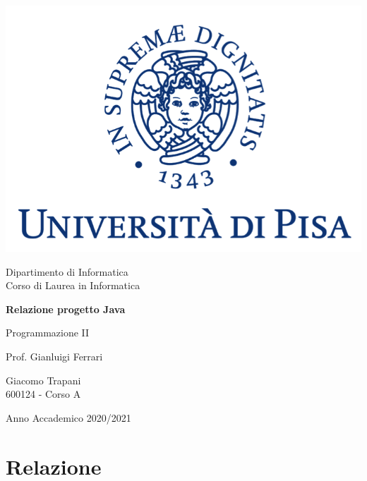 \documentclass[10pt, italian, openany]{book}
\begin{document}
\begin{titlepage}
	\clearpage\thispagestyle{empty}
	\centering
	\vspace{1cm}

    \includegraphics[scale=0.60]{unipi-logo.png}
    
	{\normalsize \noindent Dipartimento di Informatica \\
	             Corso di Laurea in Informatica \par}
	
	\vspace{2cm}
	{\Huge \textbf{Relazione progetto Java} \par}
	\vspace{1cm}
	{\large Programmazione II}
	\vspace{5cm}

    \begin{minipage}[t]{0.47\textwidth}
    	{\large{ Prof. Gianluigi Ferrari}}
    \end{minipage}\hfill\begin{minipage}[t]{0.47\textwidth}\raggedleft
    	{\large {Giacomo Trapani \\ 600124 - Corso A\\ }}
    \end{minipage}

    \vspace{4cm}

	{\normalsize Anno Accademico 2020/2021 \par}

	\pagebreak

\end{titlepage}

\chapter*{Relazione}
\end{document}
